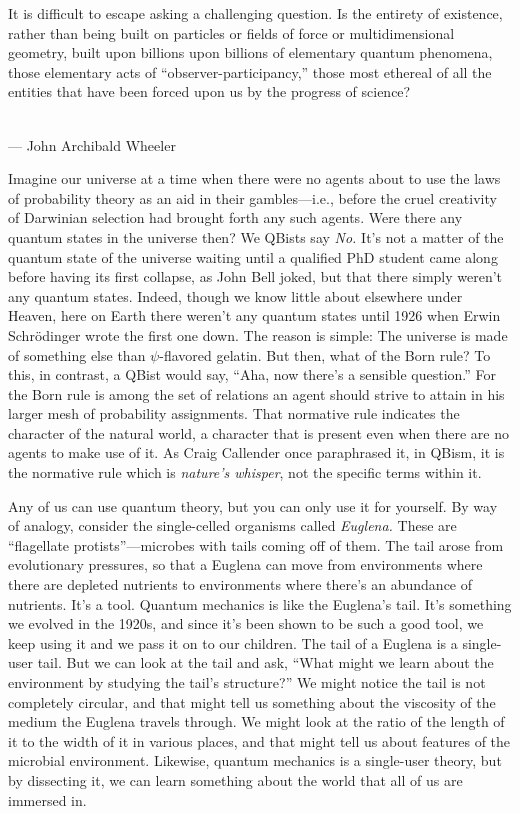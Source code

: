 \documentclass[aps,pra,superscriptaddress,10pt,tightenlines,twocolumn,nofootinbib]{revtex4}
\begin{document}
\begin{flushright}
\baselineskip=13pt
\parbox{2.8in}{\baselineskip=13pt
\small It is difficult to escape asking a challenging question. Is the
entirety of existence, rather than being built on particles or fields
of force or multidimensional geometry, built upon billions upon
billions of elementary quantum phenomena, those elementary acts of
``observer-participancy,'' those most ethereal of all the entities
that have been forced upon us by the progress of science?}
\medskip\\
\small  --- John Archibald Wheeler
\end{flushright}

Imagine our universe at a time when there were no agents about to use
the laws of probability theory as an aid in their gambles---i.e.,
before the cruel creativity of Darwinian selection had brought forth
any such agents.  Were there any quantum states in the universe then?
We QBists say {\it No.} It's not a matter of the quantum state of
the universe waiting until a qualified PhD student came along before
having its first collapse, as John Bell joked, but that there simply
weren't any quantum states.  Indeed, though we know little about
elsewhere under Heaven, here on Earth there weren't any quantum states
until 1926 when Erwin Schr\"odinger wrote the first one down. The
reason is simple: The universe is made of something else than
$\psi$-flavored gelatin. But then, what of the Born rule? To this, in
contrast, a QBist would say, ``Aha, now there's a sensible question.''
For the Born rule is among the set of relations an agent should strive
to attain in his larger mesh of probability assignments. That
normative rule indicates the character of the natural world, a
character that is present even when there are no agents to make use of
it. As Craig Callender once paraphrased it, in QBism, it is the normative rule which is {\it nature's whisper}, not
the specific terms within it.

Any of us can use quantum theory, but you can only use it for yourself. By way of analogy, consider the single-celled organisms called {\it Euglena.}  These are ``flagellate protists''---microbes with tails coming off of them. The tail arose from evolutionary pressures, so that a Euglena can move from environments where there are depleted nutrients to environments where there's an abundance of nutrients. It's a tool. Quantum mechanics is like the Euglena's tail. It's something we evolved in the 1920s, and since it's been shown to be such a good tool, we keep using it and we pass it on to our children. The tail of a Euglena is a single-user tail. But we can look at the tail and ask, ``What might we learn about the environment by studying the tail's structure?'' We might notice the tail is not completely circular, and that might tell us something about the viscosity of the medium the Euglena travels through. We might look at the ratio of the length of it to the width of it in various places, and that might tell us about features of the microbial environment. Likewise, quantum mechanics is a single-user theory, but by dissecting it, we can learn something about the world that all of us are immersed in.
\end{document}
